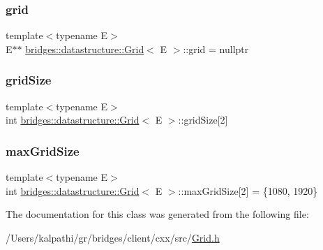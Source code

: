 \subsubsection{\texorpdfstring{grid}{grid}}
{\footnotesize\ttfamily template$<$typename E$>$ \\
E$\ast$$\ast$ \mbox{\hyperlink{classbridges_1_1datastructure_1_1_grid}{bridges\+::datastructure\+::\+Grid}}$<$ E $>$\+::grid = nullptr\hspace{0.3cm}{\ttfamily [protected]}}

\mbox{\label{classbridges_1_1datastructure_1_1_grid_a97738e6230af3e7e593e93ecfde0b731}} 
\subsubsection{\texorpdfstring{grid\+Size}{gridSize}}
{\footnotesize\ttfamily template$<$typename E$>$ \\
int \mbox{\hyperlink{classbridges_1_1datastructure_1_1_grid}{bridges\+::datastructure\+::\+Grid}}$<$ E $>$\+::grid\+Size\mbox{[}2\mbox{]}\hspace{0.3cm}{\ttfamily [protected]}}

\mbox{\label{classbridges_1_1datastructure_1_1_grid_acb1cca7db5fb42a0b107885f9e00ff67}} 
\subsubsection{\texorpdfstring{max\+Grid\+Size}{maxGridSize}}
{\footnotesize\ttfamily template$<$typename E$>$ \\
int \mbox{\hyperlink{classbridges_1_1datastructure_1_1_grid}{bridges\+::datastructure\+::\+Grid}}$<$ E $>$\+::max\+Grid\+Size\mbox{[}2\mbox{]} = \{1080, 1920\}\hspace{0.3cm}{\ttfamily [protected]}}



The documentation for this class was generated from the following file\+:\begin{DoxyCompactItemize}
\item 
/\+Users/kalpathi/gr/bridges/client/cxx/src/\mbox{\hyperlink{_grid_8h}{Grid.\+h}}\end{DoxyCompactItemize}
